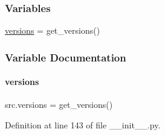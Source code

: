 \subsubsection*{Variables}
\begin{DoxyCompactItemize}
\item 
\hyperlink{namespacesrc_a1b6972a58ce0ef662f5af2a9d32b20fb}{versions} = get\+\_\+versions()
\end{DoxyCompactItemize}


\subsubsection{Variable Documentation}
\mbox{\label{namespacesrc_a1b6972a58ce0ef662f5af2a9d32b20fb}} 
\paragraph{\texorpdfstring{versions}{versions}}
{\footnotesize\ttfamily src.\+versions = get\+\_\+versions()}



Definition at line 143 of file \+\_\+\+\_\+init\+\_\+\+\_\+.\+py.


